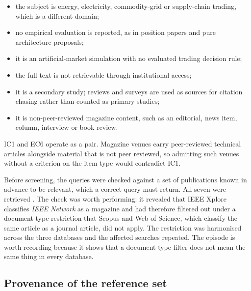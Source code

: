 \begin{itemize}[leftmargin=1.6cm]
    \item[EC1] the subject is energy, electricity, commodity-grid or supply-chain trading, which is a different domain;
    \item[EC2] no empirical evaluation is reported, as in position papers and pure architecture proposals;
    \item[EC3] it is an artificial-market simulation with no evaluated trading decision rule;
    \item[EC4] the full text is not retrievable through institutional access;
    \item[EC5] it is a secondary study; reviews and surveys are used as sources for citation chasing rather than counted as primary studies;
    \item[EC6] it is non-peer-reviewed magazine content, such as an editorial, news item, column, interview or book review.
\end{itemize}

IC1 and EC6 operate as a pair. Magazine venues carry peer-reviewed technical articles alongside material that is not peer reviewed, so admitting such venues without a criterion on the item type would contradict IC1.

Before screening, the queries were checked against a set of publications known in advance to be relevant, which a correct query must return. All seven were retrieved \cite{luo2002,hernes2016,hernes2024,shavandi2022,huang2022,kompa2009,gurgul2025}. The check was worth performing: it revealed that IEEE Xplore classifies \emph{IEEE Network} as a magazine and had therefore filtered out \cite{luo2002} under a document-type restriction that Scopus and Web of Science, which classify the same article as a journal article, did not apply. The restriction was harmonised across the three databases and the affected searches repeated. The episode is worth recording because it shows that a document-type filter does not mean the same thing in every database.

\subsection*{Provenance of the reference set}

